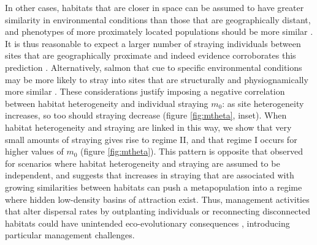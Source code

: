 \documentclass{revtex4}
\begin{document}
In other cases, habitats that are closer in space can be assumed to have greater similarity in environmental conditions than those that are geographically distant, and phenotypes of more proximately located populations should be more similar \citep{Reisenbichler:1988ex,Fraser:2011co,Westley:2012ui}.
It is thus reasonable to expect a larger number of straying individuals between sites that are geographically proximate and indeed evidence corroborates this prediction \citep{Candy:2000hu,JPE:JPE1383}.
Alternatively, salmon that cue to specific environmental conditions may be more likely to stray into sites that are structurally and physiognamically more similar \citep{Peterson:2014gy}.
These considerations justify imposing a negative correlation between habitat heterogeneity and individual straying $m_0$: as site heterogeneity increases, so too should straying decrease (figure \ref{fig:mtheta}, inset).
When habitat heterogeneity and straying are linked in this way, we show that very small amounts of straying gives rise to regime II, and that regime I occurs for higher values of $m_0$ (figure \ref{fig:mtheta}).
This pattern is opposite that observed for scenarios where habitat heterogeneity and straying are assumed to be independent, and suggests that increases in straying that are associated with growing similarities between habitats can push a metapopulation into a regime where hidden low-density basins of attraction exist.
Thus, management activities that alter dispersal rates by outplanting individuals or reconnecting disconnected habitats could have unintended eco-evolutionary consequences \citep{Anderson:2013bf,Pess:2014isa}, introducing particular management challenges.


\end{document}
